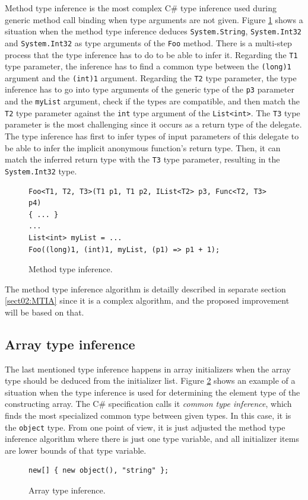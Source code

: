 Method type inference is the most complex C\# type inference used during generic method call binding when type arguments are not given.
Figure \ref{img09:methodTypeInf} shows a situation when the method type inference deduces \texttt{System.String}, \texttt{System.Int32} and \texttt{System.Int32} as type arguments of the \texttt{Foo} method. 
There is a multi-step process that the type inference has to do to be able to infer it. 
Regarding the \texttt{T1} type parameter, the inference has to find a common type between the \texttt{(long)1} argument and the \texttt{(int)1} argument. 
Regarding the \texttt{T2} type parameter, the type inference has to go into type arguments of the generic type of the \texttt{p3} parameter and the \texttt{myList} argument, check if the types are compatible, and then match the \texttt{T2} type parameter against the \texttt{int} type argument of the \texttt{List<int>}. 
The \texttt{T3} type parameter is the most challenging since it occurs as a return type of the delegate. 
The type inference has first to infer types of input parameters of this delegate to be able to infer the implicit anonymous function’s return type. 
Then, it can match the inferred return type with the \texttt{T3} type parameter, resulting in the \texttt{System.Int32} type.
\begin{figure}[h]
\begin{lstlisting}[style=csharp]
Foo<T1, T2, T3>(T1 p1, T1 p2, IList<T2> p3, Func<T2, T3> p4)
{ ... }
...
List<int> myList = ...
Foo((long)1, (int)1, myList, (p1) => p1 + 1);
\end{lstlisting}
\caption{Method type inference.}
\label{img09:methodTypeInf}
\end{figure}
\par
The method type inference algorithm is detailly described in separate section \ref{sect02:MTIA} since it is a complex algorithm, and the proposed improvement will be based on that.

\subsection{Array type inference}

The last mentioned type inference happens in array initializers when the array type should be deduced from the initializer list. 
Figure \ref{img14:arrayTypeInf} shows an example of a situation when the type inference is used for determining the element type of the constructing array. 
The C\# specification calls it \textit{common type inference}, which finds the most specialized common type between given types.
In this case, it is the \texttt{object} type.
From one point of view, it is just adjusted the method type inference algorithm where there is just one type variable, and all initializer items are lower bounds of that type variable.
\begin{figure}[h]
\begin{lstlisting}[style=csharp]
new[] { new object(), "string" };
\end{lstlisting}
\caption{Array type inference.}
\label{img14:arrayTypeInf}
\end{figure}

